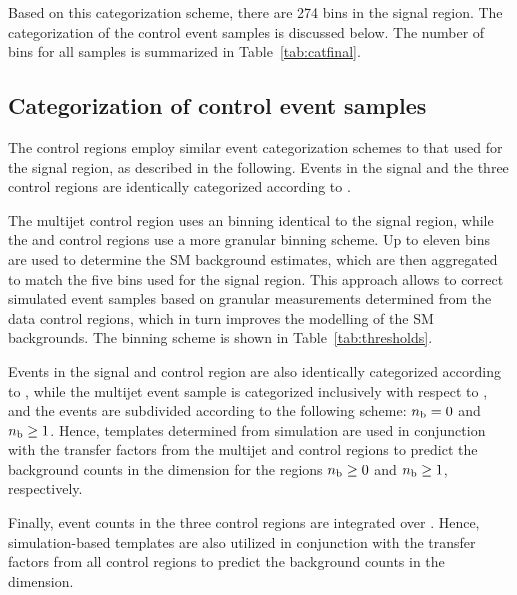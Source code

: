 Based on this categorization scheme, there are 274 bins in the signal
region. The categorization of the control event samples is discussed
below. The number of bins for all samples is summarized in
Table~\ref{tab:catfinal}. 


\subsection{Categorization of control event samples}
\label{sec:categorizationcr}

The control regions employ similar event categorization schemes to
that used for the signal region, as described in the following. Events
in the signal and the three control regions are identically
categorized according to \njet.

The multijet control region uses an \scalht binning identical to the
signal region, while the \mj and \mmj control regions use a more
granular binning scheme. Up to eleven bins are used to determine the
SM background estimates, which are then aggregated to match the five
\scalht bins used for the signal region.  This approach allows to
correct simulated event samples based on granular measurements
determined from the data control regions, which in turn improves the
modelling of the SM backgrounds. The \scalht binning scheme is shown
in Table~\ref{tab:thresholds}. 

Events in the signal and \mj control region are also identically
categorized according to \nb, while the multijet event sample is
categorized inclusively with respect to \nb, and the \mmj events are
subdivided according to the following scheme: $n_{\text{b}} = 0$ and $n_{\text{b}} \geq
1$. Hence, templates determined from simulation are used in
conjunction with the transfer factors from the multijet and \mmj
control regions to predict the background counts in the \mht
dimension for the regions $n_{\text{b}} \geq 0$ and $n_{\text{b}} \geq 1$, respectively.  

Finally, event counts in the three control regions are integrated over
\mht. Hence, simulation-based templates are also utilized in
conjunction with the transfer factors from all control regions to
predict the background counts in the \mht dimension.


